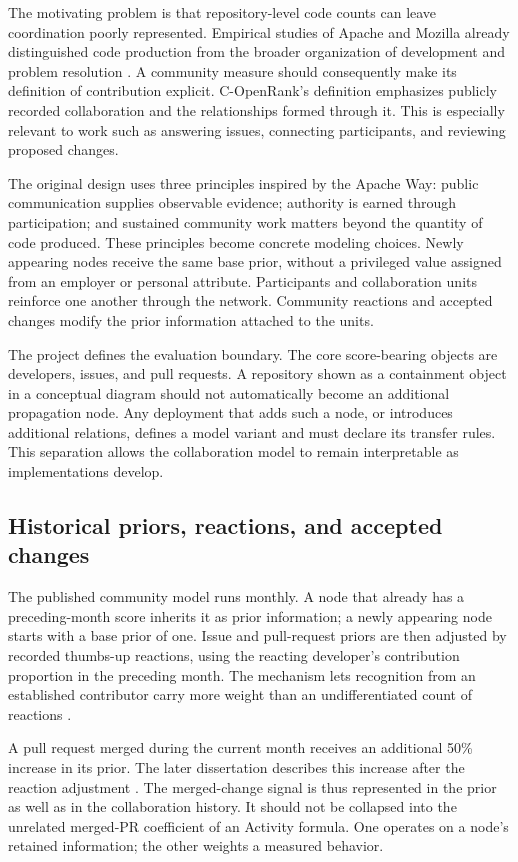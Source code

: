 The motivating problem is that repository-level code counts can leave coordination poorly represented. Empirical studies of Apache and Mozilla already distinguished code production from the broader organization of development and problem resolution \citep{mockus2002}. A community measure should consequently make its definition of contribution explicit. C-OpenRank's definition emphasizes publicly recorded collaboration and the relationships formed through it. This is especially relevant to work such as answering issues, connecting participants, and reviewing proposed changes.

The original design uses three principles inspired by the Apache Way: public communication supplies observable evidence; authority is earned through participation; and sustained community work matters beyond the quantity of code produced. These principles become concrete modeling choices. Newly appearing nodes receive the same base prior, without a privileged value assigned from an employer or personal attribute. Participants and collaboration units reinforce one another through the network. Community reactions and accepted changes modify the prior information attached to the units.

The project defines the evaluation boundary. The core score-bearing objects are developers, issues, and pull requests. A repository shown as a containment object in a conceptual diagram should not automatically become an additional propagation node. Any deployment that adds such a node, or introduces additional relations, defines a model variant and must declare its transfer rules. This separation allows the collaboration model to remain interpretable as implementations develop.

\subsection{Historical priors, reactions, and accepted changes}
The published community model runs monthly. A node that already has a preceding-month score inherits it as prior information; a newly appearing node starts with a base prior of one. Issue and pull-request priors are then adjusted by recorded thumbs-up reactions, using the reacting developer's contribution proportion in the preceding month. The mechanism lets recognition from an established contributor carry more weight than an undifferentiated count of reactions \citep[Section 3.3.3]{zhao2024}.

A pull request merged during the current month receives an additional 50\% increase in its prior. The later dissertation describes this increase after the reaction adjustment \citep[Section 6.2.1]{zhao2025thesis}. The merged-change signal is thus represented in the prior as well as in the collaboration history. It should not be collapsed into the unrelated merged-PR coefficient of an Activity formula. One operates on a node's retained information; the other weights a measured behavior.

